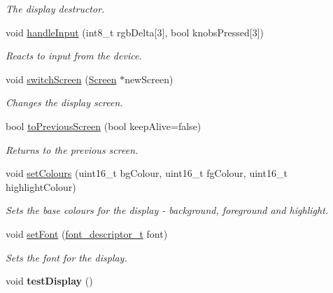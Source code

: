 \begin{DoxyCompactItemize}
\begin{DoxyCompactList}\small\item\em The display destructor. \end{DoxyCompactList}\item 
void \hyperlink{classDisplay_aa68ef5d785a1a96abdfe0a0f8ccdc379}{handle\+Input} (int8\+\_\+t rgb\+Delta\mbox{[}3\mbox{]}, bool knobs\+Pressed\mbox{[}3\mbox{]})
\begin{DoxyCompactList}\small\item\em Reacts to input from the device. \end{DoxyCompactList}\item 
void \hyperlink{classDisplay_a566e7cbce9f606a20787c6d42c189dc2}{switch\+Screen} (\hyperlink{classScreen}{Screen} $\ast$new\+Screen)
\begin{DoxyCompactList}\small\item\em Changes the display screen. \end{DoxyCompactList}\item 
bool \hyperlink{classDisplay_ad043404964c19f51bb903da796aaefda}{to\+Previous\+Screen} (bool keep\+Alive=false)
\begin{DoxyCompactList}\small\item\em Returns to the previous screen. \end{DoxyCompactList}\item 
void \hyperlink{classDisplay_a8292ad87dddbf7090e074bcff5968d93}{set\+Colours} (uint16\+\_\+t bg\+Colour, uint16\+\_\+t fg\+Colour, uint16\+\_\+t highlight\+Colour)
\begin{DoxyCompactList}\small\item\em Sets the base colours for the display -\/ background, foreground and highlight. \end{DoxyCompactList}\item 
void \hyperlink{classDisplay_afb2154f5edc1c2784ef43d0ddae9cd6d}{set\+Font} (\hyperlink{structfont__descriptor__t}{font\+\_\+descriptor\+\_\+t} font)
\begin{DoxyCompactList}\small\item\em Sets the font for the display. \end{DoxyCompactList}\item 
void {\bfseries test\+Display} ()\hypertarget{classDisplay_a98fd128bf53a5831c18a3e2af6309cca}{}\label{classDisplay_a98fd128bf53a5831c18a3e2af6309cca}


\end{DoxyCompactItemize}
